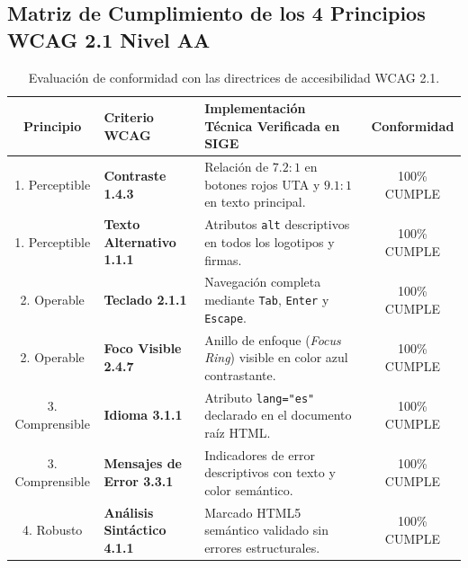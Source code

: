 \documentclass[12pt,a4paper]{article}
\begin{document}
\subsection{Matriz de Cumplimiento de los 4 Principios WCAG 2.1 Nivel AA}
\begin{table}[H]
\centering
\small
\renewcommand{\arraystretch}{1.15}
\begin{tabularx}{\textwidth}{|c|>{\raggedright\arraybackslash\bfseries}m{2.8cm}|X|c|}
\hline
\rowcolor{tableheader}
\textbf{Principio} & \textbf{Criterio WCAG} & \textbf{Implementación Técnica Verificada en SIGE} & \textbf{Conformidad} \\
\hline
1. Perceptible & Contraste 1.4.3 & Relación de $7.2:1$ en botones rojos UTA y $9.1:1$ en texto principal. & 100\% CUMPLE \\
\hline
1. Perceptible & Texto Alternativo 1.1.1 & Atributos \texttt{alt} descriptivos en todos los logotipos y firmas. & 100\% CUMPLE \\
\hline
2. Operable & Teclado 2.1.1 & Navegación completa mediante \texttt{Tab}, \texttt{Enter} y \texttt{Escape}. & 100\% CUMPLE \\
\hline
2. Operable & Foco Visible 2.4.7 & Anillo de enfoque (\textit{Focus Ring}) visible en color azul contrastante. & 100\% CUMPLE \\
\hline
3. Comprensible & Idioma 3.1.1 & Atributo \texttt{lang="es"} declarado en el documento raíz HTML. & 100\% CUMPLE \\
\hline
3. Comprensible & Mensajes de Error 3.3.1 & Indicadores de error descriptivos con texto y color semántico. & 100\% CUMPLE \\
\hline
4. Robusto & Análisis Sintáctico 4.1.1 & Marcado HTML5 semántico validado sin errores estructurales. & 100\% CUMPLE \\
\hline
\end{tabularx}
\caption{Evaluación de conformidad con las directrices de accesibilidad WCAG 2.1.}
\end{table}
\end{document}
